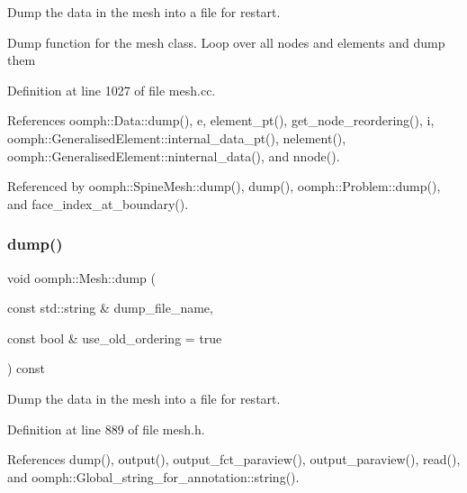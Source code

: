 Dump the data in the mesh into a file for restart. 

Dump function for the mesh class. Loop over all nodes and elements and dump them 

Definition at line 1027 of file mesh.\+cc.



References oomph\+::\+Data\+::dump(), e, element\+\_\+pt(), get\+\_\+node\+\_\+reordering(), i, oomph\+::\+Generalised\+Element\+::internal\+\_\+data\+\_\+pt(), nelement(), oomph\+::\+Generalised\+Element\+::ninternal\+\_\+data(), and nnode().



Referenced by oomph\+::\+Spine\+Mesh\+::dump(), dump(), oomph\+::\+Problem\+::dump(), and face\+\_\+index\+\_\+at\+\_\+boundary().

\mbox{\label{classoomph_1_1Mesh_afa8d0d8b55c1bb10982fe5449fd6389e}} 
\subsubsection{\texorpdfstring{dump()}{dump()}\hspace{0.1cm}{\footnotesize\ttfamily [2/2]}}
{\footnotesize\ttfamily void oomph\+::\+Mesh\+::dump (\begin{DoxyParamCaption}\item[{const std\+::string \&}]{dump\+\_\+file\+\_\+name,  }\item[{const bool \&}]{use\+\_\+old\+\_\+ordering = {\ttfamily true} }\end{DoxyParamCaption}) const\hspace{0.3cm}{\ttfamily [inline]}}



Dump the data in the mesh into a file for restart. 



Definition at line 889 of file mesh.\+h.



References dump(), output(), output\+\_\+fct\+\_\+paraview(), output\+\_\+paraview(), read(), and oomph\+::\+Global\+\_\+string\+\_\+for\+\_\+annotation\+::string().

\mbox{\label{classoomph_1_1Mesh_a3c3b85a1be4d9b01f1c0805142a37966}} 
